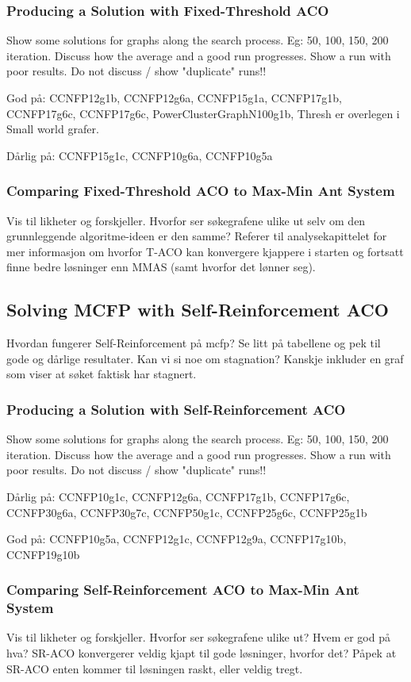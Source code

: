 \subsubsection{Producing a Solution with Fixed-Threshold ACO}
Show some solutions for graphs along the search process. Eg: 50, 100, 150, 200 iteration. Discuss how the average and a good run progresses. Show a run with poor results. Do not discuss / show "duplicate" runs!!

God på: CCNFP12g1b, CCNFP12g6a, CCNFP15g1a, CCNFP17g1b, CCNFP17g6c, CCNFP17g6c, PowerClusterGraphN100g1b, Thresh er overlegen i Small world grafer. 

Dårlig på: CCNFP15g1c, CCNFP10g6a, CCNFP10g5a

\subsubsection{Comparing Fixed-Threshold ACO to Max-Min Ant System}
Vis til likheter og forskjeller. Hvorfor ser søkegrafene ulike ut selv om den grunnleggende algoritme-ideen er den samme? Referer til analysekapittelet for mer informasjon om hvorfor T-ACO kan konvergere kjappere i starten og fortsatt finne bedre løsninger enn MMAS (samt hvorfor det lønner seg).



\subsection{Solving MCFP with Self-Reinforcement ACO}
Hvordan fungerer Self-Reinforcement på mcfp? Se litt på tabellene og pek til gode og dårlige resultater. Kan vi si noe om stagnation? Kanskje inkluder en graf som viser at søket faktisk har stagnert.

\subsubsection{Producing a Solution with Self-Reinforcement ACO}
Show some solutions for graphs along the search process. Eg: 50, 100, 150, 200 iteration. Discuss how the average and a good run progresses. Show a run with poor results. Do not discuss / show "duplicate" runs!!

Dårlig på: CCNFP10g1c, CCNFP12g6a, CCNFP17g1b, CCNFP17g6c, CCNFP30g6a, CCNFP30g7c, CCNFP50g1c, CCNFP25g6c, CCNFP25g1b

God på: CCNFP10g5a, CCNFP12g1c, CCNFP12g9a, CCNFP17g10b, CCNFP19g10b

\subsubsection{Comparing Self-Reinforcement ACO to Max-Min Ant System}
Vis til likheter og forskjeller. Hvorfor ser søkegrafene ulike ut? Hvem er god på hva? SR-ACO konvergerer veldig kjapt til gode løsninger, hvorfor det? Påpek at SR-ACO enten kommer til løsningen raskt, eller veldig tregt.



